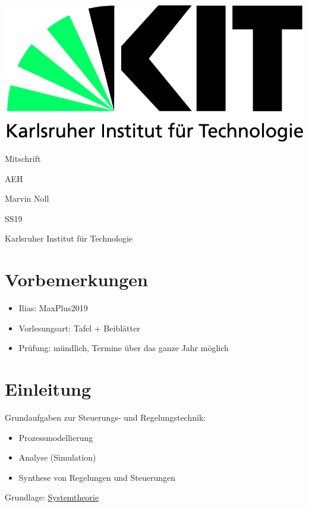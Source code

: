 \documentclass[12pt,a4paper]{scrartcl}
\numberwithin{equation}{section}
\begin{document}
  \pagestyle{empty}
  \begin{titlepage}
    \includegraphics[scale=0.45]{kit-logo.jpg} 
    \vspace*{2cm} 

 \begin{center} \large 
    Mitschrift
    \vspace*{2cm}

    {\huge AEH}
    \vspace*{2.5cm}

    Marvin Noll
    \vspace*{1.5cm}

    SS19
    \vspace*{4.5cm}


		Karlsruher Institut für Technologie
  \end{center}
\end{titlepage}
  \tableofcontents
\newpage
  \pagestyle{headings}

\section*{Vorbemerkungen}
\begin{itemize}
	\item Ilias: MaxPlus2019
	\item Vorlesungsart: Tafel + Beiblätter
	\item Prüfung: mündlich, Termine über das ganze Jahr möglich
\end{itemize}

\section{Einleitung}
Grundaufgaben zur Steuerungs- und Regelungstechnik:
\begin{itemize}
	\item Prozessmodellierung
	\item Analyse (Simulation)
	\item Synthese von Regelungen und Steuerungen 
\end{itemize}
Grundlage: \underline{Systemtheorie}
\end{document}
